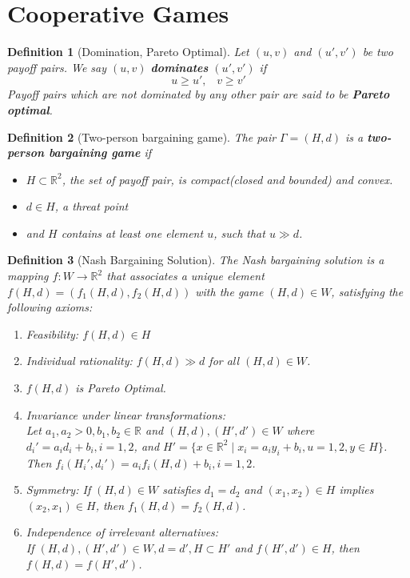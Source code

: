 \documentclass[12pt]{article}
\newtheorem{definition}{Definition}[section]
\theoremstyle{definition}
\begin{document}
\section{Cooperative Games}
\begin{definition}[Domination, Pareto Optimal]
\normalfont Let $(u, v)$ and $(u', v')$ be two payoff pairs. We say $(u, v)$ \textbf{dominates} $(u', v')$ if
\[
u\geq u',\;\;\; v\geq v'
\]
Payoff pairs which are not dominated by any other pair are said to be \textbf{Pareto optimal}.
\end{definition}
\begin{definition}[Two-person bargaining game]
\normalfont The pair $\Gamma = (H, d)$ is a \textbf{two-person bargaining game} if
\begin{itemize}
  \item $H\subset \mathbb{R}^2$, the set of payoff pair, is compact(closed and bounded) and convex.
  \item $d\in H$, a threat point
  \item and $H$ contains at least one element $u$, such that $u\gg d$.
\end{itemize}
\end{definition}
\begin{definition}[Nash Bargaining Solution]
\normalfont The Nash bargaining solution is a mapping $f: W\to \mathbb{R}^2$ that associates a unique element $f(H, d)=(f_1(H,d), f_2(H, d))$ with the game $(H, d)\in W$, satisfying the following axioms:
\begin{enumerate}
  \item Feasibility: $f(H,d)\in H$
  \item Individual rationality: $f(H, d)\gg d$ for all $(H, d)\in W$.
  \item $f(H, d)$ is Pareto Optimal.
  \item Invariance under linear transformations:\\
  Let $a_1, a_2>0, b_1, b_2\in \mathbb{R}$ and $(H, d), (H', d')\in W$ where $d_i'=a_id_i+b_i, i=1,2$, and $H'=\{x\in \mathbb{R}^2\mid x_i=a_iy_i+b_i, u=1, 2, y\in H\}$. Then $f_i(H_i', d_i')=a_if_i(H, d)+b_i, i=1,2$.
  \item Symmetry: If $(H, d)\in W$ satisfies $d_1=d_2$ and $(x_1, x_2)\in H$ implies $(x_2, x_1)\in H$, then $f_1(H, d)=f_2(H,d)$.
  \item Independence of irrelevant alternatives:\\
  If $(H, d), (H', d')\in W, d=d', H\subset H'$ and $f(H', d')\in H$, then $f(H, d)=f(H', d')$.
\end{enumerate}
\end{definition}
\end{document}

